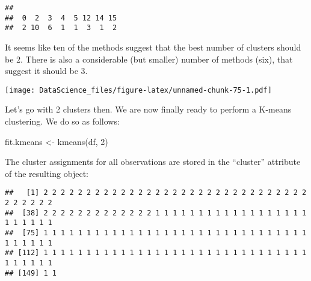 \documentclass[
]{book}
\newenvironment{Shaded}{\begin{snugshade}}{\end{snugshade}}
\newcommand{\AttributeTok}[1]{\textcolor[rgb]{0.77,0.63,0.00}{#1}}
\newcommand{\DecValTok}[1]{\textcolor[rgb]{0.00,0.00,0.81}{#1}}
\newcommand{\FunctionTok}[1]{\textcolor[rgb]{0.00,0.00,0.00}{#1}}
\newcommand{\NormalTok}[1]{#1}
\newcommand{\OtherTok}[1]{\textcolor[rgb]{0.56,0.35,0.01}{#1}}
\newcommand{\SpecialCharTok}[1]{\textcolor[rgb]{0.00,0.00,0.00}{#1}}
\newcommand{\StringTok}[1]{\textcolor[rgb]{0.31,0.60,0.02}{#1}}
\begin{document}
\begin{verbatim}
## 
##  0  2  3  4  5 12 14 15 
##  2 10  6  1  1  3  1  2
\end{verbatim}

It seems like ten of the methods suggest that the best number of clusters should be 2. There is also a considerable (but smaller) number of methods (six), that suggest it should be 3.

\begin{Shaded}
\end{Shaded}

\texttt{[image: DataScience\_files/figure-latex/unnamed-chunk-75-1.pdf]}

Let's go with 2 clusters then. We are now finally ready to perform a K-means clustering. We do so as follows:

\begin{Shaded}
\begin{Highlighting}[]
\NormalTok{fit.kmeans }\OtherTok{\textless{}{-}} \FunctionTok{kmeans}\NormalTok{(df, }\DecValTok{2}\NormalTok{)}
\end{Highlighting}
\end{Shaded}

The cluster assignments for all observations are stored in the ``cluster'' attribute of the resulting object:

\begin{Shaded}
\end{Shaded}

\begin{verbatim}
##   [1] 2 2 2 2 2 2 2 2 2 2 2 2 2 2 2 2 2 2 2 2 2 2 2 2 2 2 2 2 2 2 2 2 2 2 2 2 2
##  [38] 2 2 2 2 2 2 2 2 2 2 2 2 2 1 1 1 1 1 1 1 1 1 1 1 1 1 1 1 1 1 1 1 1 1 1 1 1
##  [75] 1 1 1 1 1 1 1 1 1 1 1 1 1 1 1 1 1 1 1 1 1 1 1 1 1 1 1 1 1 1 1 1 1 1 1 1 1
## [112] 1 1 1 1 1 1 1 1 1 1 1 1 1 1 1 1 1 1 1 1 1 1 1 1 1 1 1 1 1 1 1 1 1 1 1 1 1
## [149] 1 1
\end{verbatim}
\end{document}
